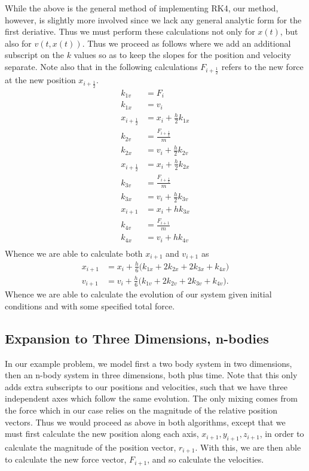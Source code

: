 \documentclass[11pt,a4paper]{article}
\begin{document}
	While the above is the general method of implementing RK4, our method, however, is slightly more involved since we lack any general analytic form for the first deriative. Thus we must perform these calculations not only for $x(t)$, but also for $v(t,x(t))$. Thus we proceed as follows where we add an additional subscript on the $k$ values so as to keep the slopes for the position and velocity separate. Note also that in the following calculations $F_{i+\frac{1}{2}}$ refers to the new force at the new position $x_{i+\frac{1}{2}}$.
\begin{align}
k_{1v} & = F_i \\
k_{1x} &= v_i \\
x_{i+\frac{1}{2}} &= x_i + \frac{h}{2}k_{1x} \\
k_{2v} &= \frac{F_{i+\frac{1}{2}}}{m} \\
k_{2x} &= v_i + \frac{h}{2}k_{2v} \\
x_{i+\frac{1}{2}} &= x_i + \frac{h}{2}k_{2x} \\
k_{3v} &= \frac{F_{i+\frac{1}{2}}}{m} \\
k_{3x} &= v_i + \frac{h}{2}k_{3v} \\
x_{i+1} &= x_i + hk_{3x} \\
k_{4v} &= \frac{F_{i+1}}{m} \\
k_{4x} &= v_i + hk_{4v} \\
\end{align}
Whence we are able to calculate both $x_{i+1}$ and $v_{i+1}$ as
\begin{align}
x_{i+1} &= x_i + \frac{h}{6}\big(k_{1x} + 2k_{2x} + 2k_{3x} + k_{4x}\big) \\
v_{i+1} &= v_i + \frac{h}{6}\big(k_{1v} + 2k_{2v} + 2k_{3v} + k_{4v}\big).
\end{align}
Whence we are able to calculate the evolution of our system given initial conditions and with some specified total force. 

\subsection{Expansion to Three Dimensions, n-bodies}

In our example problem, we model first a two body system in two dimensions, then an n-body system in three dimensions, both plus time. Note that this only adds extra subscripts to our positions and velocities, such that we have three independent axes which follow the same evolution. The only mixing comes from the force which in our case relies on the magnitude of the relative position vectors. Thus we would proceed as above in both algorithms, except that we must first calculate the new position along each axis, $x_{i+1}, y_{i+1}, z_{i+1}$, in order to calculate the magnitude of the position vector, $r_{i+1}$. With this, we are then able to calculate the new force vector, $F_{i+1}$, and so calculate the velocities. 
\end{document}
